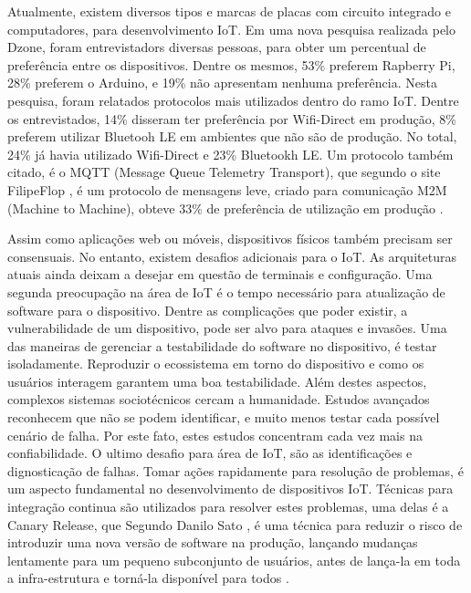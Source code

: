 \documentclass[journal]{IEEEtran}
\begin{document}
Atualmente, existem diversos tipos e marcas de placas com circuito integrado e computadores, para desenvolvimento IoT. Em uma nova pesquisa realizada pelo Dzone, foram entrevistadors diversas pessoas, para obter um percentual de preferência entre os dispositivos. Dentre os mesmos, 53\% preferem Rapberry Pi, 28\% preferem o Arduino, e 19\% não apresentam nenhuma preferência. Nesta pesquisa, foram relatados protocolos mais utilizados dentro do ramo IoT. Dentre os entrevistados, 14\% disseram ter preferência por Wifi-Direct em produção, 8\% preferem utilizar Bluetooh LE em ambientes que não são de produção. No total, 24\% já havia utilizado Wifi-Direct e 23\% Bluetookh LE. Um protocolo também citado, é o MQTT (Message Queue Telemetry Transport), que segundo o site FilipeFlop \cite{filipeflopnodemcu}, é um protocolo de mensagens leve, criado para comunicação M2M (Machine to Machine),  obteve 33\% de preferência de utilização em produção \cite[p.~4]{dzoneiotvolume4}.

Assim como aplicações web ou móveis, dispositivos físicos também precisam ser consensuais. No entanto, existem desafios adicionais para o IoT. As arquiteturas atuais ainda deixam a desejar em questão de terminais e configuração. Uma segunda preocupação na área de IoT é o tempo necessário para atualização de software para o dispositivo. Dentre as  complicações que poder existir, a vulnerabilidade de um dispositivo, pode ser alvo para ataques e invasões. Uma das maneiras de gerenciar a testabilidade do software no dispositivo, é testar isoladamente. Reproduzir o ecossistema em torno do dispositivo e como os usuários interagem garantem uma boa testabilidade. Além destes aspectos, complexos sistemas sociotécnicos cercam a humanidade. Estudos avançados reconhecem que não se podem identificar, e muito menos testar cada possível cenário de falha. Por este fato, estes estudos concentram cada vez mais na confiabilidade. O ultimo desafio para área de IoT, são as identificações e dignosticação de falhas. Tomar ações rapidamente para resolução de problemas, é um aspecto fundamental no desenvolvimento de dispositivos IoT. Técnicas para integração continua são utilizados para resolver estes problemas, uma delas é a Canary Release, que Segundo Danilo Sato \cite{danilosato2017}, é uma técnica para reduzir o risco de introduzir uma nova versão de software na produção, lançando mudanças lentamente para um pequeno subconjunto de usuários, antes de lança-la em toda a infra-estrutura e torná-la disponível para todos \cite[p.~9]{dzoneiotvolume4}.
\end{document}
